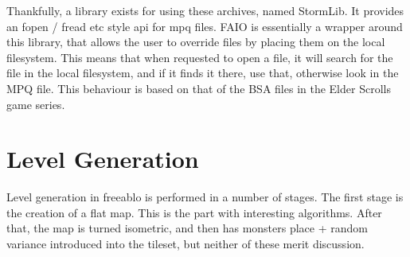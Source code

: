 	Thankfully, a library exists for using these archives, named StormLib\cite{stormlib}. It provides an fopen / fread etc style api for mpq files.
	FAIO is essentially a wrapper around this library, that allows the user to override files by placing them on the local filesystem. This means that when requested to open a file, it will search for the file in the local filesystem, and if it finds it there, use that, otherwise look in the MPQ file.
	This behaviour is based on that of the BSA files in the Elder Scrolls game series.
	
\newpage
	
\section{Level Generation}
    Level generation in freeablo is performed in a number of stages. The first stage is the creation of a flat map. This is the part with interesting algorithms.
    After that, the map is turned isometric, and then has monsters place + random variance introduced into the tileset, but neither of these merit discussion.

    \mbox{}

